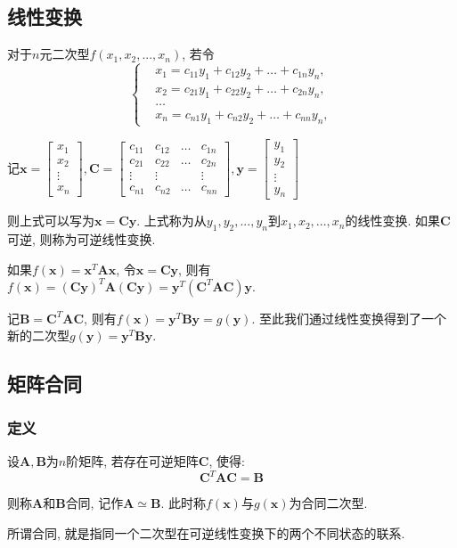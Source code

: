 \subsection{线性变换}
对于$ n $元二次型$ f(x_{1}, x_{2},... ,x_{n}) $, 若令
\begin{equation*}
\left\{
\begin{aligned}
& x_{1} = c_{11}y_{1}+c_{12}y_{2}+\dots +c_{1n}y_{n}, \\ 
& x_{2} = c_{21}y_{1}+c_{22}y_{2}+\dots +c_{2n}y_{n}, \\
& \dots \\
& x_{n} = c_{n1}y_{1}+c_{n2}y_{2}+\dots +c_{nn}y_{n},
\end{aligned}
\right.
\end{equation*}\par
记$ \bm{x}=\begin{bmatrix}
x_1 \\
x_2 \\
\vdots \\
x_n 
\end{bmatrix}, \bm{C}=\begin{bmatrix}
c_{11} & c_{12} & \dots & c_{1n} \\
c_{21} & c_{22} & \dots & c_{2n} \\
\vdots & \vdots &  & \vdots \\
c_{n1} & c_{n2} & \dots & c_{nn} 
\end{bmatrix}, \bm{y}=\begin{bmatrix}
y_1 \\
y_2 \\
\vdots \\
y_n 
\end{bmatrix}$\par \vspace{1em}
则上式可以写为$ \bm{x}=\bm{C}\bm{y} $. 上式称为从$ y_{1}, y_{2},... ,y_{n} $到$ x_{1}, x_{2},... ,x_{n} $的线性变换. 如果$ \bm{C} $可逆, 则称为可逆线性变换.\par
如果$ f(\bm{x})=\bm{x}^{T}\bm{A}\bm{x} $, 令$ \bm{x}=\bm{C}\bm{y} $, 则有$ f(\bm{x})=(\bm{C}\bm{y})^{T}\bm{A}(\bm{C}\bm{y})=\bm{y}^{T}(\bm{C}^{T}\bm{A}\bm{C})\bm{y}. $\par
记$ \bm{B}=\bm{C}^{T}\bm{A}\bm{C} $, 则有$ f(\bm{x})=\bm{y}^{T}\bm{B}\bm{y}=g(\bm{y}) $. 至此我们通过线性变换得到了一个新的二次型$g(\bm{y})=\bm{y}^{T}\bm{B}\bm{y}$.
\subsection{矩阵合同}
\subsubsection{定义}
设$ \bm{A}, \bm{B} $为$ n $阶矩阵, 若存在可逆矩阵$ \bm{C} $, 使得:
\begin{equation*}
\bm{C}^{T}\bm{A}\bm{C}=\bm{B}
\end{equation*}\par
则称$ \bm{A} $和$ \bm{B} $合同, 记作$ \bm{A}\simeq \bm{B} $. 此时称$ f(\bm{x}) $与$ g(\bm{x}) $为合同二次型.\par
所谓合同, 就是指同一个二次型在可逆线性变换下的两个不同状态的联系.

